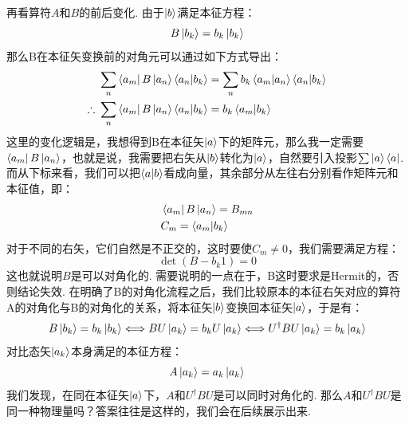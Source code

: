 再看算符\(A\)和\(B\)的前后变化. 由于\(\ket{b}\)满足本征方程：
\[
B\ket{b_{k}} = b_{k}\ket{b_{k}}
\]
那么B在本征矢变换前的对角元可以通过如下方式导出：
\begin{align*}
& \sum_{n}\bra{a_{m}}B\ket{a_{n}}\bra{a_{n}}\ket{b_{k}} = \sum_{n}b_{k}\bra{a_{m}}\ket{a_{n}}\bra{a_{n}}\ket{b_{k}} \\
\therefore\ 
& \sum_{n}\bra{a_{m}}B\ket{a_{n}}\bra{a_{n}}\ket{b_{k}} = b_{k}\bra{a_{m}}\ket{b_{k}}
\end{align*}
这里的变化逻辑是，我想得到B在本征矢\(\ket{a}\)下的矩阵元，那么我一定需要\(\bra{a_{m}}B\ket{a_{n}}\)，也就是说，我需要把右矢从\(\ket{b}\)转化为\(\ket{a}\)，自然要引入投影\(\sum\ket{a}\bra{a}\). 而从下标来看，我们可以把\(\bra{a}\ket{b}\)看成向量，其余部分从左往右分别看作矩阵元和本征值，即：
\begin{align*}
& \bra{a_{m}}B\ket{a_{n}} = B_{mn} \\
& C_{m} = \bra{a_{m}}\ket{b_{k}}
\end{align*}
对于不同的右矢，它们自然是不正交的，这时要使\(C_{m}\neq 0\)，我们需要满足方程：
\[
\det(B - b_{k}1) = 0
\]
这也就说明\(B\)是可以对角化的. 需要说明的一点在于，B这时要求是Hermit的，否则结论失效. 在明确了B的对角化流程之后，我们比较原本的本征右矢对应的算符A的对角化与B的对角化的关系，将本征矢\(\ket{b}\)变换回本征矢\(\ket{a}\)，于是有：
\[
B\ket{b_{k}} = b_{k}\ket{b_{k}} \Longleftrightarrow BU\ket{a_{k}} = b_{k}U\ket{a_{k}}\Longleftrightarrow U^{\dagger}BU\ket{a_{k}} = b_{k}\ket{a_{k}}
\]
对比态矢\(\ket{a_{k}}\)本身满足的本征方程：
\[
A\ket{a_{k}} = a_{k}\ket{a_{k}}
\]
我们发现，在同在本征矢\(\ket{a}\)下，\(A\)和\(U^{\dagger}BU\)是可以同时对角化的. 那么\(A\)和\(U^{\dagger}BU\)是同一种物理量吗？答案往往是这样的，我们会在后续展示出来. 
